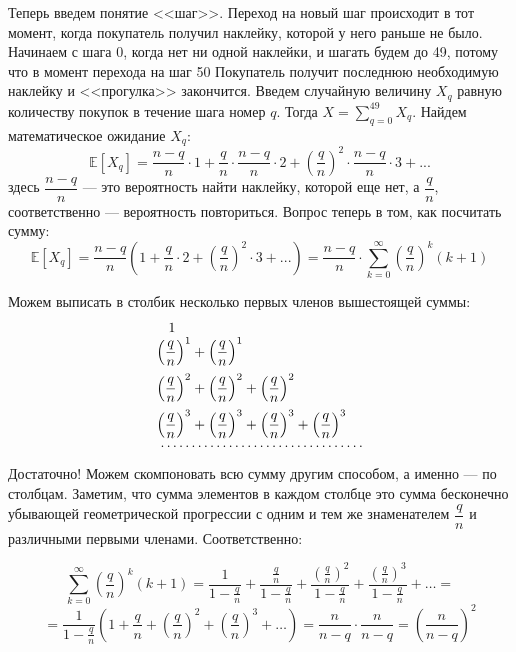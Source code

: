 \documentclass[a4paper,12pt]{article}
\theoremstyle{plain}                         %
\theoremstyle{definition}                  %
\theoremstyle{remark}                      %
\begin{document}
Теперь введем понятие <<шаг>>. Переход на новый шаг происходит в тот момент, когда покупатель получил наклейку, которой у него раньше не было. Начинаем с шага 0, когда нет ни одной наклейки, и шагать будем до 49, потому что в момент перехода на шаг 50 Покупатель получит последнюю необходимую наклейку и <<прогулка>> закончится. Введем случайную величину $X_q$ равную количеству покупок в течение шага номер $q$. Тогда $X = \sum \limits_{q=0}^{49}X_q$.  Найдем математическое ожидание $X_q$:
$$
\mathbb{E}[X_q] = \frac{n-q}{n}\cdot 1 + \frac{q}{n}\cdot\frac{n-q}{n}\cdot 2 + \left(\frac{q}{n}\right)^2\cdot\frac{n-q}{n}\cdot 3 + ...
$$
здесь $\dfrac{n-q}{n}$ ---  это вероятность найти наклейку, которой еще нет, а $\dfrac{q}{n}$, соответственно --- вероятность повториться. Вопрос теперь в том, как посчитать сумму:
$$
\mathbb{E}[X_q] = \frac{n-q}{n}\left( 1 + \frac{q}{n}\cdot 2 + \left(\frac{q}{n}\right)^2 \cdot 3 + ...\right) = \frac{n-q}{n}\cdot\sum\limits_{k=0}^{\infty}\left(\frac{q}{n}\right)^k(k+1)
$$

Можем выписать в столбик несколько первых членов вышестоящей суммы:
$$
\begin{array}{l}
\hspace{0.3cm}1 \\
\vspace{0.2cm}
\left(\dfrac{q}{n}\right)^1  + \left(\dfrac{q}{n}\right)^1  \\
\vspace{0.2cm}
\left(\dfrac{q}{n}\right)^2 + \left(\dfrac{q}{n}\right)^2  + \left(\dfrac{q}{n}\right)^2 \\
\left(\dfrac{q}{n}\right)^3 + \left(\dfrac{q}{n}\right)^3 + \left(\dfrac{q}{n}\right)^3 + \left(\dfrac{q}{n}\right)^3 \\    
\hspace{0.1cm}\cdots\cdots\cdots\cdots\cdots\cdots\cdots\cdots\cdots\cdots\cdots   
\end{array}
$$
Достаточно! Можем скомпоновать всю сумму другим способом, а именно --- по столбцам. Заметим, что сумма элементов в каждом столбце это сумма бесконечно убывающей геометрической прогрессии с одним и тем же знаменателем $\dfrac{q}{n}$ и различными первыми членами. Соответственно:

$$
\sum\limits_{k=0}^{\infty}\left(\frac{q}{n}\right)^k(k+1) = \dfrac{1}{1-\frac{q}{n}} + \dfrac{\frac{q}{n}}{1-\frac{q}{n}} + \dfrac{\left(\frac{q}{n}\right)^2}{1-\frac{q}{n}} + \dfrac{\left(\frac{q}{n}\right)^3}{1-\frac{q}{n}} + \dots =
$$
$$
= \frac{1}{1-\frac{q}{n}}\left( 1 + \frac{q}{n} + \left(\frac{q}{n}\right)^2 + \left(\frac{q}{n}\right)^3 + \dots\right) = \frac{n}{n-q}\cdot\frac{n}{n-q} = \left( \frac{n}{n-q}\right)^2
$$
\end{document}
